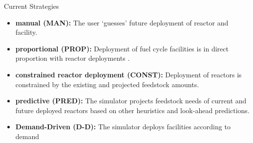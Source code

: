 \documentclass[final]{beamer}
\newlength{\onecolwid}
\newlength{\twocolwid}
\begin{document}
\begin{frame}[t]
\begin{columns}[t]
\begin{column}{\twocolwid}
\begin{columns}[t,totalwidth=\twocolwid]
\begin{column}{\onecolwid}

\end{column} %

\end{columns} %



\begin{columns}[t,totalwidth=\twocolwid] %

\begin{column}{\onecolwid} %


\begin{block}{Current Strategies}
	
	\begin{itemize}
		\item \textbf{manual (MAN):} The user `guesses' future deployment of reactor and facility.
		\item \textbf{proportional (PROP):} Deployment of fuel cycle facilities is in 
		direct proportion with reactor deployments .
		\item \textbf{constrained reactor deployment (CONST):} Deployment of reactors is 
		constrained by the existing and projected feedstock amounts.
		\item \textbf{predictive (PRED):} The simulator projects feedstock needs of 
		current and future deployed reactors based on other heuristics 
		and look-ahead predictions. 
		\item \textbf{Demand-Driven (D-D):} The simulator deploys facilities according
		to demand
	\end{itemize}


\end{block}
\end{column}
\end{columns}
\end{column}
\end{columns}
\end{frame}
\end{document}
